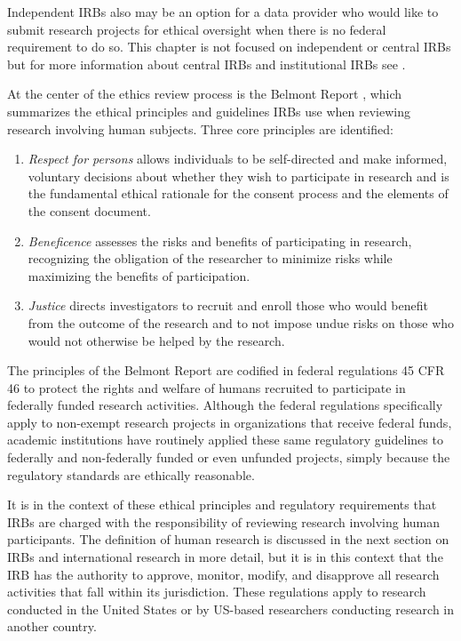 Independent IRBs also may be an option for a data provider who would like to submit research projects for ethical oversight when there is no federal requirement to do so. This chapter is not focused on independent or central IRBs but for more information about central IRBs and institutional IRBs see \citet{wandile2018}.

At the center of the ethics review process is the Belmont Report \citep{belmont1979}, which summarizes the ethical principles and guidelines IRBs use when reviewing research involving human subjects. Three core principles are identified:

\begin{enumerate}
\def\labelenumi{\arabic{enumi}.}
\tightlist
\item
  \emph{Respect for persons} allows individuals to be self-directed and make informed, voluntary decisions about whether they wish to participate in research and is the fundamental ethical rationale for the consent process and the elements of the consent document.
\item
  \emph{Beneficence} assesses the risks and benefits of participating in research, recognizing the obligation of the researcher to minimize risks while maximizing the benefits of participation.
\item
  \emph{Justice} directs investigators to recruit and enroll those who would benefit from the outcome of the research and to not impose undue risks on those who would not otherwise be helped by the research.
\end{enumerate}

The principles of the Belmont Report are codified in federal regulations 45 CFR 46 to protect the rights and welfare of humans recruited to participate in federally funded research activities. Although the federal regulations specifically apply to non-exempt research projects in organizations that receive federal funds, academic institutions have routinely applied these same regulatory guidelines to federally and non-federally funded or even unfunded projects, simply because the regulatory standards are ethically reasonable.

It is in the context of these ethical principles and regulatory requirements that IRBs are charged with the responsibility of reviewing research involving human participants. The definition of human research is discussed in the next section on IRBs and international research in more detail, but it is in this context that the IRB has the authority to approve, monitor, modify, and disapprove all research activities that fall within its jurisdiction. These regulations apply to research conducted in the United States or by US-based researchers conducting research in another country.

